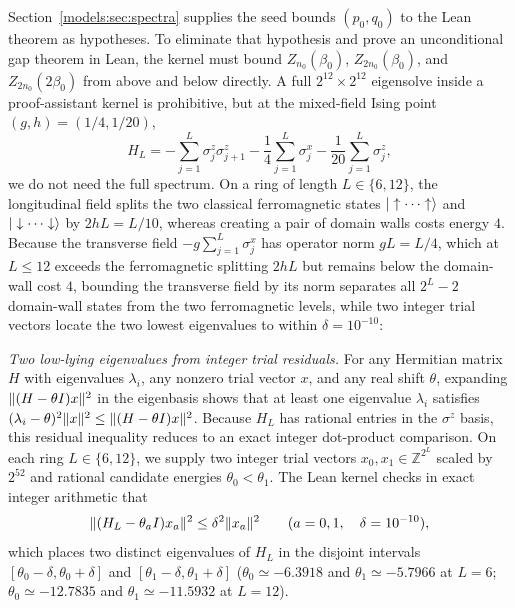 Section~\ref{models:sec:spectra} supplies the seed bounds $(p_0,q_0)$ to
the Lean theorem as hypotheses. To eliminate that hypothesis and prove an
unconditional gap theorem in Lean, the kernel must bound
$Z_{n_0}(\beta_0)$, $Z_{2n_0}(\beta_0)$, and $Z_{2n_0}(2\beta_0)$ from
above and below directly. A full $2^{12}\times2^{12}$ eigensolve inside
a proof-assistant kernel is prohibitive, but at the mixed-field Ising
point $(g,h)=(1/4,1/20)$,
\begin{equation}
    H_L=-\sum_{j=1}^L\sigma_j^z\sigma_{j+1}^z
    -\frac14\sum_{j=1}^L\sigma_j^x
    -\frac1{20}\sum_{j=1}^L\sigma_j^z,
    \label{models:eq:ising}
\end{equation}
we do not need the full spectrum. On a ring of length $L\in\{6,12\}$,
the longitudinal field splits the two classical ferromagnetic states
$|\uparrow\cdots\uparrow\rangle$ and $|\downarrow\cdots\downarrow\rangle$ by
$2hL=L/10$, whereas creating a pair of domain walls costs energy $4$.
Because the transverse field $-g\sum_{j=1}^L\sigma_j^x$ has operator
norm $gL=L/4$, which at $L\le12$ exceeds the ferromagnetic splitting
$2hL$ but remains below the domain-wall cost $4$, bounding the
transverse field by its norm separates all $2^L-2$ domain-wall states
from the two ferromagnetic levels, while two integer trial vectors
locate the two lowest eigenvalues to within $\delta=10^{-10}$:
\begin{proofdiagram}
    \isingsandwich
\end{proofdiagram}

\emph{Two low-lying eigenvalues from integer trial residuals.}
For any Hermitian matrix $H$ with eigenvalues $\lambda_i$, any nonzero
trial vector $x$, and any real shift $\theta$, expanding
$\|(H-\theta I)x\|^2$ in the eigenbasis shows that at least one
eigenvalue $\lambda_i$ satisfies
$(\lambda_i-\theta)^2\|x\|^2\le\|(H-\theta I)x\|^2$. Because $H_L$ has
rational entries in the $\sigma^z$ basis, this residual inequality
reduces to an exact integer dot-product comparison. On each ring
$L\in\{6,12\}$, we supply two integer trial vectors
$x_0,x_1\in\mathbb Z^{2^L}$ scaled by $2^{52}$ and rational candidate
energies $\theta_0<\theta_1$. The Lean kernel checks in exact integer
arithmetic that%
~
\begin{equation}
    \|(H_L-\theta_aI)x_a\|^2\le\delta^2\|x_a\|^2
    \qquad(a=0,1,\quad\delta=10^{-10}),
    \label{models:eq:residual}
\end{equation}
which places two distinct eigenvalues of $H_L$ in the disjoint intervals
$[\theta_0-\delta,\theta_0+\delta]$ and
$[\theta_1-\delta,\theta_1+\delta]$ ($\theta_0\simeq-6.3918$ and
$\theta_1\simeq-5.7966$ at $L=6$; $\theta_0\simeq-12.7835$ and
$\theta_1\simeq-11.5932$ at $L=12$).

